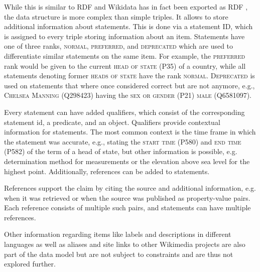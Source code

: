 \documentclass[hyperref,bachelorofscience,fleqn]{cgvpub}
\begin{document}
While this is similar to RDF and Wikidata has in fact been exported as RDF \cite{EGKMV2014}, the data structure is more complex than simple triples. It allows to store additional information about statements. This is done via a statement ID, which is assigned to every triple storing information about an item. Statements have one of three ranks, \textsc{normal}, \textsc{preferred}, and \textsc{deprecated} which are used to differentiate similar statements on the same item. For example, the \textsc{preferred} rank would be given to the current \textsc{head of state} (P35) of a country, while all statements denoting former \textsc{heads of state} have the rank \textsc{normal}. \textsc{Deprecated} is used on statements that where once considered correct but are not anymore, e.g., \textsc{Chelsea Manning} (Q298423) having the \textsc{sex or gender} (P21) \textsc{male} (Q6581097).

Every statement can have added qualifiers, which consist of the corresponding statement id, a predicate, and an object. Qualifiers provide contextual information for statements. The most common context is the time frame in which the statement was accurate, e.g., stating the \textsc{start time} (P580) and \textsc{end time} (P582) of the term of a head of state, but other information is possible, e.g. determination method for measurements or the elevation above sea level for the highest point. Additionally, references can be added to statements.

References support the claim by citing the source and additional information, e.g. when it was retrieved or when the source was published as property-value pairs. Each reference consists of multiple such pairs, and statements can have multiple references.

Other information regarding items like labels and descriptions in different languages as well as aliases and site links to other Wikimedia projects are also part of the data model but are not subject to constraints and are thus not explored further.
\end{document}
